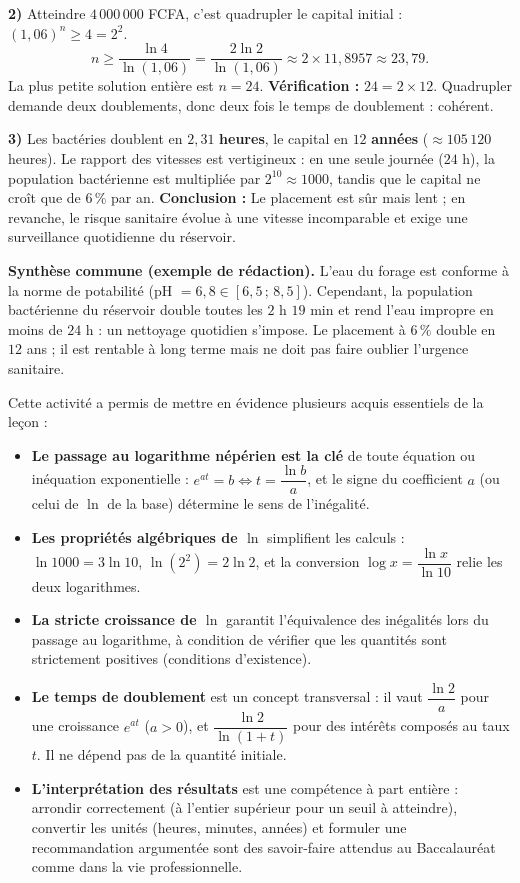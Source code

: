 \documentclass[11pt]{article}
\newcounter{popsec}
\newcounter{popsub}
\newcommand{\courssub}[1]{%
  \stepcounter{popsub}%
  \par\vspace{9pt}\noindent{\popxbold\fontsize{11.5}{13}\selectfont\color{popink}{\color{poporange}\thepopsec.\thepopsub}\hspace{6pt}#1}\par\nopagebreak\vspace{4pt}
}
\begin{document}
\begin{exoresolu}
\textbf{2)} Atteindre $4\,000\,000$ FCFA, c'est quadrupler le capital initial : $(1{,}06)^n \geq 4 = 2^2$.
\[ n \geq \frac{\ln 4}{\ln(1{,}06)} = \frac{2\ln 2}{\ln(1{,}06)} \approx 2 \times 11{,}8957 \approx 23{,}79. \]
La plus petite solution entière est $n = 24$.
\textbf{Vérification :} $24 = 2 \times 12$. Quadrupler demande deux doublements, donc deux fois le temps de doublement : cohérent.

\textbf{3)} Les bactéries doublent en $2{,}31$ \textbf{heures}, le capital en $12$ \textbf{années} ($\approx 105\,120$ heures).
Le rapport des vitesses est vertigineux : en une seule journée ($24$ h), la population bactérienne est multipliée par $2^{10} \approx 1000$, tandis que le capital ne croît que de $6\,\%$ par an.
\textbf{Conclusion :} Le placement est sûr mais lent ; en revanche, le risque sanitaire évolue à une vitesse incomparable et exige une surveillance quotidienne du réservoir.

\textbf{Synthèse commune (exemple de rédaction).}
\og L'eau du forage est conforme à la norme de potabilité (pH $= 6{,}8 \in [6{,}5\,;\,8{,}5]$). Cependant, la population bactérienne du réservoir double toutes les $2$ h $19$ min et rend l'eau impropre en moins de $24$ h : un nettoyage quotidien s'impose. Le placement à $6\,\%$ double en $12$ ans ; il est rentable à long terme mais ne doit pas faire oublier l'urgence sanitaire. \fg
\end{exoresolu}

\courssub{Bilan de l'activité}

Cette activité a permis de mettre en évidence plusieurs acquis essentiels de la leçon :

\begin{itemize}
\item \textbf{Le passage au logarithme népérien est la clé} de toute équation ou inéquation exponentielle : $e^{at} = b \iff t = \dfrac{\ln b}{a}$, et le signe du coefficient $a$ (ou celui de $\ln$ de la base) détermine le sens de l'inégalité.
\item \textbf{Les propriétés algébriques de $\ln$} simplifient les calculs : $\ln 1000 = 3\ln 10$, $\ln(2^2) = 2\ln 2$, et la conversion $\log x = \dfrac{\ln x}{\ln 10}$ relie les deux logarithmes.
\item \textbf{La stricte croissance de $\ln$} garantit l'équivalence des inégalités lors du passage au logarithme, à condition de vérifier que les quantités sont strictement positives (conditions d'existence).
\item \textbf{Le temps de doublement} est un concept transversal : il vaut $\dfrac{\ln 2}{a}$ pour une croissance $e^{at}$ ($a>0$), et $\dfrac{\ln 2}{\ln(1+t)}$ pour des intérêts composés au taux $t$. Il ne dépend pas de la quantité initiale.
\item \textbf{L'interprétation des résultats} est une compétence à part entière : arrondir correctement (à l'entier supérieur pour un seuil à atteindre), convertir les unités (heures, minutes, années) et formuler une recommandation argumentée sont des savoir-faire attendus au Baccalauréat comme dans la vie professionnelle.
\end{itemize}
\end{document}
